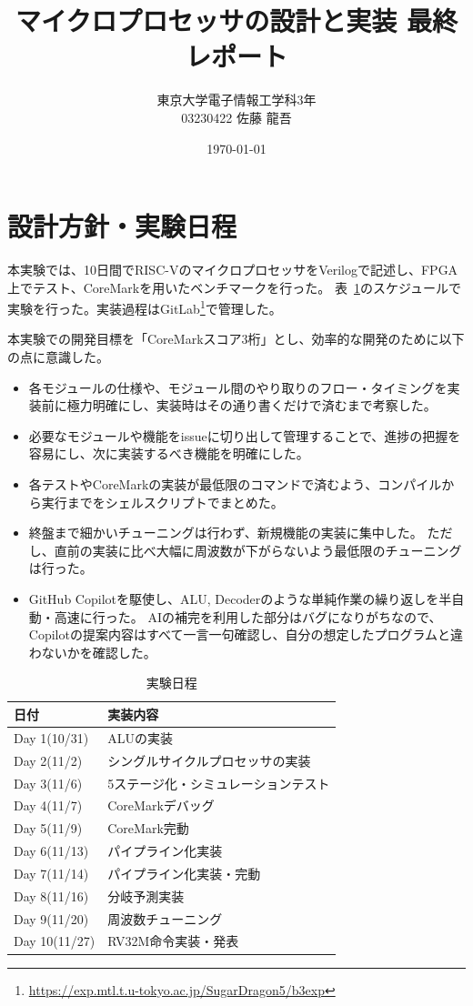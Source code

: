 \documentclass[dvipdfmx,10pt,a4paper,titlepage]{jsarticle}
\title{マイクロプロセッサの設計と実装 最終レポート}
\author{
    東京大学電子情報工学科3年\\
    03230422 佐藤 龍吾
}
\date{\today}
\begin{document}
    \maketitle
    \section{設計方針・実験日程}
    本実験では、10日間でRISC-VのマイクロプロセッサをVerilogで記述し、FPGA上でテスト、CoreMarkを用いたベンチマークを行った。
    表~\ref{tab:day}のスケジュールで実験を行った。実装過程はGitLab\footnote{\url{https://exp.mtl.t.u-tokyo.ac.jp/SugarDragon5/b3exp}}で管理した。

    本実験での開発目標を「CoreMarkスコア3桁」とし、効率的な開発のために以下の点に意識した。
    \begin{itemize}
        \item 各モジュールの仕様や、モジュール間のやり取りのフロー・タイミングを実装前に極力明確にし、実装時はその通り書くだけで済むまで考察した。
        \item 必要なモジュールや機能をissueに切り出して管理することで、進捗の把握を容易にし、次に実装するべき機能を明確にした。
        \item 各テストやCoreMarkの実装が最低限のコマンドで済むよう、コンパイルから実行までをシェルスクリプトでまとめた。
        \item 終盤まで細かいチューニングは行わず、新規機能の実装に集中した。
        ただし、直前の実装に比べ大幅に周波数が下がらないよう最低限のチューニングは行った。
        \item GitHub Copilotを駆使し、ALU, Decoderのような単純作業の繰り返しを半自動・高速に行った。
        AIの補完を利用した部分はバグになりがちなので、Copilotの提案内容はすべて一言一句確認し、自分の想定したプログラムと違わないかを確認した。
    \end{itemize}
    \begin{table}[h]
        \begin{center}
            \caption{実験日程}\label{tab:day}
            \begin{tabular}{l|l}
                日付 & 実装内容 \\ \hline
                Day 1(10/31) & ALUの実装 \\
                Day 2(11/2)  & シングルサイクルプロセッサの実装 \\
                Day 3(11/6)  & 5ステージ化・シミュレーションテスト \\
                Day 4(11/7)  & CoreMarkデバッグ \\
                Day 5(11/9)  & CoreMark完動 \\
                Day 6(11/13) & パイプライン化実装 \\
                Day 7(11/14) & パイプライン化実装・完動 \\
                Day 8(11/16) & 分岐予測実装 \\
                Day 9(11/20) & 周波数チューニング \\
                Day 10(11/27)& RV32M命令実装・発表
            \end{tabular}
        \end{center}
    \end{table}
\end{document}
